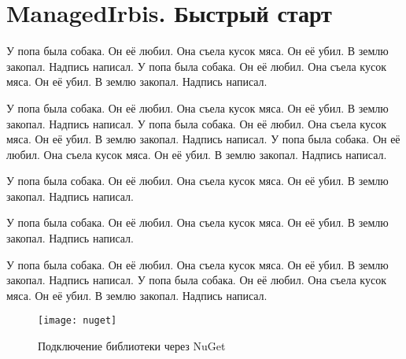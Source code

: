 \chapter{ManagedIrbis. Быстрый старт}

У попа была собака. Он её любил. Она съела кусок мяса. Он её убил. В землю закопал. Надпись написал. У попа была собака. Он её любил. Она съела кусок мяса. Он её убил. В землю закопал. Надпись написал.

У попа была собака. Он её любил. Она съела кусок мяса. Он её убил. В землю закопал. Надпись написал. У попа была собака. Он её любил. Она съела кусок мяса. Он её убил. В землю закопал. Надпись написал. У попа была собака. Он её любил. Она съела кусок мяса. Он её убил. В землю закопал. Надпись написал.

У попа была собака. Он её любил. Она съела кусок мяса. Он её убил. В землю закопал. Надпись написал.

У попа была собака. Он её любил. Она съела кусок мяса. Он её убил. В землю закопал. Надпись написал.

У попа была собака. Он её любил. Она съела кусок мяса. Он её убил. В землю закопал. Надпись написал. У попа была собака. Он её любил. Она съела кусок мяса. Он её убил. В землю закопал. Надпись написал.

\begin{figure}[h]
	\centering
	\texttt{[image: nuget]}
	\caption{Подключение библиотеки через NuGet}
\end{figure}


